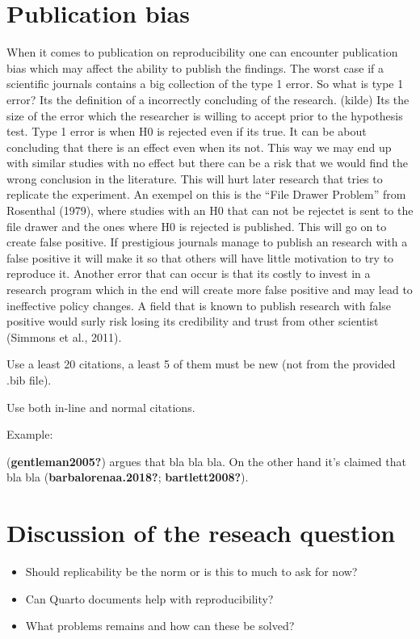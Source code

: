 \documentclass[
  british,
  a4paper,
]{article}
\providecommand{\tightlist}{%
  \setlength{\itemsep}{0pt}\setlength{\parskip}{0pt}}
\begin{document}
\section{Publication bias}\label{publication-bias}

When it comes to publication on reproducibility one can encounter
publication bias which may affect the ability to publish the findings.
The worst case if a scientific journals contains a big collection of the
type 1 error. So what is type 1 error? Its the definition of a
incorrectly concluding of the research. (kilde) Its the size of the
error which the researcher is willing to accept prior to the hypothesis
test. Type 1 error is when H0 is rejected even if its true. It can be
about concluding that there is an effect even when its not. This way we
may end up with similar studies with no effect but there can be a risk
that we would find the wrong conclusion in the literature. This will
hurt later research that tries to replicate the experiment. An exempel
on this is the ``File Drawer Problem'' from Rosenthal (1979), where
studies with an H0 that can not be rejectet is sent to the file drawer
and the ones where H0 is rejected is published. This will go on to
create false positive. If prestigious journals manage to publish an
research with a false positive it will make it so that others will have
little motivation to try to reproduce it. Another error that can occur
is that its costly to invest in a research program which in the end will
create more false positive and may lead to ineffective policy changes. A
field that is known to publish research with false positive would surly
risk losing its credibility and trust from other scientist (Simmons et
al., 2011).

Use a least 20 citations, a least 5 of them must be new (not from the
provided .bib file).

Use both in-line and normal citations.

Example:

(\textbf{gentleman2005?}) argues that bla bla bla. On the other hand
it's claimed that bla bla (\textbf{barbalorenaa.2018?};
\textbf{bartlett2008?}).

\section{Discussion of the reseach
question}\label{discussion-of-the-reseach-question}

\begin{itemize}
\tightlist
\item
  Should replicability be the norm or is this to much to ask for now?
\item
  Can Quarto documents help with reproducibility?
\item
  What problems remains and how can these be solved?
\end{itemize}
\end{document}
